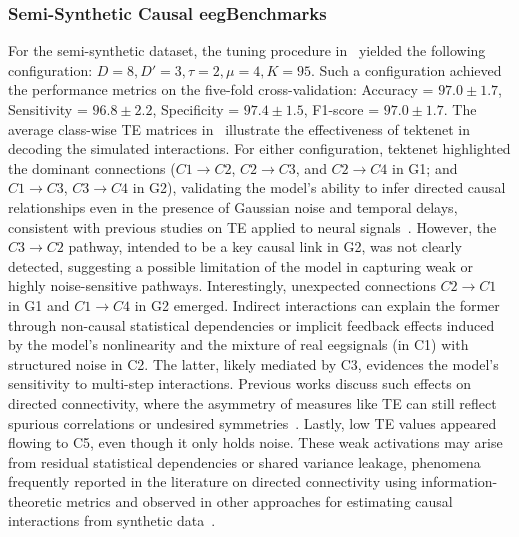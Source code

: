 \subsubsection{Semi-Synthetic Causal \gls{eeg}Benchmarks}


For the semi-synthetic dataset, the tuning procedure in~ yielded the following configuration: $D = 8, D' = 3, \tau = 2, \mu = 4, K = 95$. Such a configuration achieved the performance metrics on the five-fold cross-validation: Accuracy = $97.0\pm1.7$, Sensitivity = $96.8\pm2.2$, Specificity = $97.4\pm1.5$, F1-score = $97.0\pm1.7$. The average class-wise TE matrices in~ illustrate the effectiveness of \gls{tektenet} in decoding the simulated interactions. For either configuration, \gls{tektenet} highlighted the dominant connections ($C1 \rightarrow C2$, $C2 \rightarrow C3$, and $C2 \rightarrow C4$ in G1; and $C1 \rightarrow C3$, $C3 \rightarrow C4$ in G2), validating the model's ability to infer directed causal relationships even in the presence of Gaussian noise and temporal delays, consistent with previous studies on TE applied to neural signals~\cite{schreiber2000measuring,Vicente2011,faes2011information}. However, the $C3\rightarrow C2$ pathway, intended to be a key causal link in G2, was not clearly detected, suggesting a possible limitation of the model in capturing weak or highly noise-sensitive pathways. Interestingly, unexpected connections $C2\rightarrow C1$ in G1 and $C1\rightarrow C4$ in G2 emerged. Indirect interactions can explain the former through non-causal statistical dependencies or implicit feedback effects induced by the model's nonlinearity and the mixture of real \gls{eeg}signals (in C1) with structured noise in C2. The latter, likely mediated by C3, evidences the model's sensitivity to multi-step interactions. Previous works discuss such effects on directed connectivity, where the asymmetry of measures like TE can still reflect spurious correlations or undesired symmetries~\cite{bossomaier2016transfer,Stramaglia}. Lastly, low TE values appeared flowing to C5, even though it only holds noise. These weak activations may arise from residual statistical dependencies or shared variance leakage, phenomena frequently reported in the literature on directed connectivity using information-theoretic metrics and observed in other approaches for estimating causal interactions from synthetic data~\cite{barnett2009granger}.

